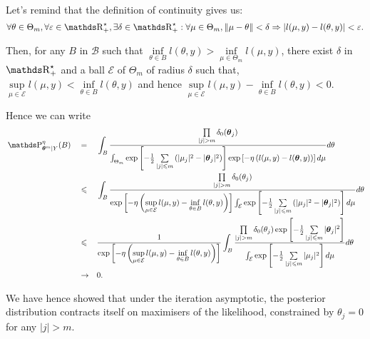 \begin{pro}\label{PRO_BAYES_SIEVE_SELF_INFORMATIVE}
Let's remind that the definition of continuity gives us:
\[\forall \theta \in \Theta_{m}, \forall \epsilon \in \R_{+}^{\star}, \exists \delta \in \R_{+}^{\star} : \forall \mu \in \Theta_{m}, \Vert \mu - \theta \Vert < \delta \Rightarrow \vert l(\mu, y) - l(\theta, y) \vert < \epsilon.\]

\medskip

Then, for any $B$ in $\mathcal{B}$ such that $\inf\limits_{\theta \in B} l(\theta, y) > \inf\limits_{\mu \in \Theta_{m}} l(\mu, y)$, there exist $\delta$ in $\R_{+}^{\star}$ and a ball $\mathcal{E}$ of $\Theta_{m}$ of radius $\delta$ such that, $\sup\limits_{\mu \in \mathcal{E}} l(\mu, y) < \inf\limits_{\theta \in B}l(\theta, y)$ and hence $\sup\limits_{\mu \in \mathcal{E}}l(\mu, y) - \inf\limits_{\theta \in B}l(\theta, y) < 0$.

Hence we can write
\begin{alignat*}{3}
& \P_{\boldsymbol{\theta}^{m}\vert Y}^{\eta}(B) && = && \int_{B} \frac{\prod\limits_{\vert j \vert > m} \delta_{0}(\boldsymbol{\theta}_{j})}{\int_{\Theta_{m}} \exp\left[-\frac{1}{2}\sum\limits_{\vert j \vert \leq m} \left(\vert \mu_{j} \vert^{2} - \vert \boldsymbol{\theta}_{j} \vert^{2}\right)\right]\exp\left[-\eta\left(l(\mu, y) - l(\boldsymbol{\theta}, y)\right)\right] d\mu} d \theta\\
& && \leq && \int_{B} \frac{\prod\limits_{\vert j \vert > m} \delta_{0}(\theta_{j})}{\exp\left[-\eta\left(\sup\limits_{\mu \in \mathcal{E}} l(\mu, y) - \inf\limits_{\theta \in B}l(\theta, y)\right)\right] \int_{\mathcal{E}} \exp\left[-\frac{1}{2}\sum\limits_{\vert j \vert \leq m} \left(\vert \mu_{j} \vert^{2} - \vert \boldsymbol{\theta}_{j} \vert^{2}\right)\right]d\mu} d \theta\\
& && \leq && \frac{1}{\exp\left[-\eta\left(\sup\limits_{\mu \in \mathcal{E}} l(\mu, y) - \inf\limits_{\theta \in B}l(\theta, y)\right)\right]}\int_{B} \frac{\prod\limits_{\vert j \vert > m} \delta_{0}(\theta_{j}) \exp\left[-\frac{1}{2}\sum\limits_{\vert j \vert \leq m} \vert \boldsymbol{\theta}_{j} \vert^{2}\right]}{ \int_{\mathcal{E}} \exp\left[-\frac{1}{2}\sum\limits_{\vert j \vert \leq m} \vert \mu_{j} \vert^{2}\right]d\mu} d \theta\\
& && \rightarrow && 0.
\end{alignat*}
\proEnd
\end{pro}

We have hence showed that under the iteration asymptotic, the posterior distribution contracts itself on maximisers of the likelihood, constrained by $\theta_{j} = 0$ for any $\vert j \vert > m$.

